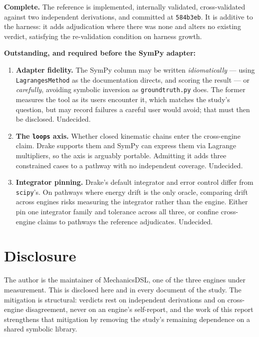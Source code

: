 \documentclass[11pt,a4paper]{article}
\newcommand{\gitsha}[1]{\texttt{#1}}
\begin{document}
\noindent\textbf{Complete.} The reference is implemented, internally validated,
cross-validated against two independent derivations, and committed at
\gitsha{584b3eb}. It is additive to the harness: it adds adjudication where
there was none and alters no existing verdict, satisfying the re-validation
condition on harness growth.

\noindent\textbf{Outstanding, and required before the SymPy adapter:}

\begin{enumerate}[leftmargin=1.5em,itemsep=0.3em]
  \item \textbf{Adapter fidelity.} The SymPy column may be written
        \emph{idiomatically} --- using \texttt{LagrangesMethod} as the
        documentation directs, and scoring the result --- or \emph{carefully},
        avoiding symbolic inversion as \texttt{groundtruth.py} does. The former
        measures the tool as its users encounter it, which matches the study's
        question, but may record failures a careful user would avoid; that must
        then be disclosed. Undecided.
  \item \textbf{The \texttt{loops} axis.} Whether closed kinematic chains enter
        the cross-engine claim. Drake supports them and SymPy can express them
        via Lagrange multipliers, so the axis is arguably portable. Admitting
        it adds three constrained cases to a pathway with no independent
        coverage. Undecided.
  \item \textbf{Integrator pinning.} Drake's default integrator and error
        control differ from \texttt{scipy}'s. On pathways where energy drift is
        the only oracle, comparing drift across engines risks measuring the
        integrator rather than the engine. Either pin one integrator family and
        tolerance across all three, or confine cross-engine claims to pathways
        the reference adjudicates. Undecided.
\end{enumerate}

\section{Disclosure}\label{sec:disclosure}

The author is the maintainer of MechanicsDSL, one of the three engines under
measurement. This is disclosed here and in every document of the study. The
mitigation is structural: verdicts rest on independent derivations and on
cross-engine disagreement, never on an engine's self-report, and the work of
this report strengthens that mitigation by removing the study's remaining
dependence on a shared symbolic library.
\end{document}
